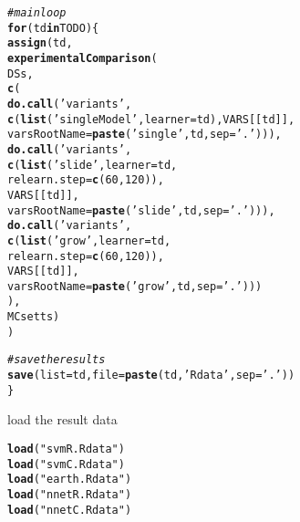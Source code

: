 \documentclass{article}\usepackage[]{graphicx}\usepackage[]{color}
\makeatletter
\newcommand{\hlnum}[1]{\textcolor[rgb]{0.686,0.059,0.569}{#1}}%
\newcommand{\hlstr}[1]{\textcolor[rgb]{0.192,0.494,0.8}{#1}}%
\newcommand{\hlcom}[1]{\textcolor[rgb]{0.678,0.584,0.686}{\textit{#1}}}%
\newcommand{\hlstd}[1]{\textcolor[rgb]{0.345,0.345,0.345}{#1}}%
\newcommand{\hlkwa}[1]{\textcolor[rgb]{0.161,0.373,0.58}{\textbf{#1}}}%
\newcommand{\hlkwc}[1]{\textcolor[rgb]{0.333,0.667,0.333}{#1}}%
\newcommand{\hlkwd}[1]{\textcolor[rgb]{0.737,0.353,0.396}{\textbf{#1}}}%
\newenvironment{kframe}{%
 \def\at@end@of@kframe{}%
 \ifinner\ifhmode%
  \def\at@end@of@kframe{\end{minipage}}%
  \begin{minipage}{\columnwidth}%
 \fi\fi%
 \def\FrameCommand##1{\hskip\@totalleftmargin \hskip-\fboxsep
 \colorbox{shadecolor}{##1}\hskip-\fboxsep
     \hskip-\linewidth \hskip-\@totalleftmargin \hskip\columnwidth}%
 \MakeFramed {\advance\hsize-\width
   \@totalleftmargin\z@ \linewidth\hsize
   \@setminipage}}%
 {\par\unskip\endMakeFramed%
 \at@end@of@kframe}
\newenvironment{knitrout}{}{} %
\makeatother
\begin{document}
\begin{knitrout}
\begin{kframe}
\begin{alltt}
\hlcom{# main loop}
\hlkwa{for}\hlstd{(td} \hlkwa{in} \hlstd{TODO) \{}
  \hlkwd{assign}\hlstd{(td,}
         \hlkwd{experimentalComparison}\hlstd{(}
           \hlstd{DSs,}
           \hlkwd{c}\hlstd{(}
             \hlkwd{do.call}\hlstd{(}\hlstr{'variants'}\hlstd{,}
                     \hlkwd{c}\hlstd{(}\hlkwd{list}\hlstd{(}\hlstr{'singleModel'}\hlstd{,}\hlkwc{learner}\hlstd{=td),VARS[[td]],}
                       \hlkwc{varsRootName}\hlstd{=}\hlkwd{paste}\hlstd{(}\hlstr{'single'}\hlstd{,td,}\hlkwc{sep}\hlstd{=}\hlstr{'.'}\hlstd{))),}
             \hlkwd{do.call}\hlstd{(}\hlstr{'variants'}\hlstd{,}
                     \hlkwd{c}\hlstd{(}\hlkwd{list}\hlstd{(}\hlstr{'slide'}\hlstd{,}\hlkwc{learner}\hlstd{=td,}
                            \hlkwc{relearn.step}\hlstd{=}\hlkwd{c}\hlstd{(}\hlnum{60}\hlstd{,}\hlnum{120}\hlstd{)),}
                       \hlstd{VARS[[td]],}
                       \hlkwc{varsRootName}\hlstd{=}\hlkwd{paste}\hlstd{(}\hlstr{'slide'}\hlstd{,td,}\hlkwc{sep}\hlstd{=}\hlstr{'.'}\hlstd{))),}
             \hlkwd{do.call}\hlstd{(}\hlstr{'variants'}\hlstd{,}
                     \hlkwd{c}\hlstd{(}\hlkwd{list}\hlstd{(}\hlstr{'grow'}\hlstd{,}\hlkwc{learner}\hlstd{=td,}
                            \hlkwc{relearn.step}\hlstd{=}\hlkwd{c}\hlstd{(}\hlnum{60}\hlstd{,}\hlnum{120}\hlstd{)),}
                       \hlstd{VARS[[td]],}
                       \hlkwc{varsRootName}\hlstd{=}\hlkwd{paste}\hlstd{(}\hlstr{'grow'}\hlstd{,td,}\hlkwc{sep}\hlstd{=}\hlstr{'.'}\hlstd{)))}
             \hlstd{),}
            \hlstd{MCsetts)}
         \hlstd{)}

  \hlcom{# save the results}
  \hlkwd{save}\hlstd{(}\hlkwc{list}\hlstd{=td,}\hlkwc{file}\hlstd{=}\hlkwd{paste}\hlstd{(td,}\hlstr{'Rdata'}\hlstd{,}\hlkwc{sep}\hlstd{=}\hlstr{'.'}\hlstd{))}
\hlstd{\}}
\end{alltt}
\end{kframe}
\end{knitrout}
load the result data
\begin{knitrout}
\color{fgcolor}\begin{kframe}
\begin{alltt}
\hlkwd{load}\hlstd{(}\hlstr{"svmR.Rdata"}\hlstd{)}
\hlkwd{load}\hlstd{(}\hlstr{"svmC.Rdata"}\hlstd{)}
\hlkwd{load}\hlstd{(}\hlstr{"earth.Rdata"}\hlstd{)}
\hlkwd{load}\hlstd{(}\hlstr{"nnetR.Rdata"}\hlstd{)}
\hlkwd{load}\hlstd{(}\hlstr{"nnetC.Rdata"}\hlstd{)}
\end{alltt}
\end{kframe}
\end{knitrout}
\end{document}
